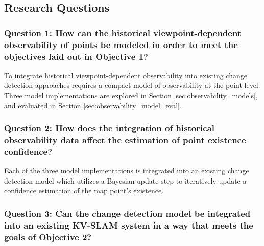 \subsection{Research Questions}

\subsubsection*{Question 1: How can the historical viewpoint-dependent observability of points be modeled in order to meet the objectives laid out in Objective 1?}

To integrate historical viewpoint-dependent observability into existing change detection approaches requires a compact model of observability at the point level. Three model implementations are explored in Section \ref{sec:observability_models}, and evaluated in Section \ref{sec:observability_model_eval}.

\subsubsection*{Question 2: How does the integration of historical observability data affect the estimation of point existence confidence?}

Each of the three model implementations is integrated into an existing change detection model which utilizes a Bayesian update step to iteratively update a confidence estimation of the map point's existence. 

\subsubsection*{Question 3: Can the change detection model be integrated into an existing KV-SLAM system in a way that meets the goals of Objective 2?}